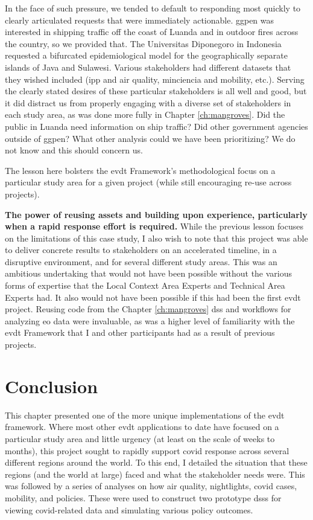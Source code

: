 In the face of such pressure, we tended to default to responding most quickly to clearly articulated requests that were immediately actionable. \ac{ggpen} was interested in shipping traffic off the coast of Luanda and in outdoor fires across the country, so we provided that. The Universitas Diponegoro in Indonesia requested a bifurcated epidemiological model for the geographically separate islands of Java and Sulawesi. Various stakeholders had different datasets that they wished included (\ac{ipp} and air quality, \ac{minciencia} and mobility, etc.). Serving the clearly stated desires of these particular stakeholders is all well and good, but it did distract us from properly engaging with a diverse set of stakeholders in each study area, as was done more fully in Chapter \ref{ch:mangroves}. Did the public in Luanda need information on ship traffic? Did other government agencies outside of \ac{ggpen}? What other analysis could we have been prioritizing? We do not know and this should concern us.

The lesson here bolsters the \ac{evdt} Framework's methodological focus on a particular study area for a given project (while still encouraging re-use across projects). 

\textbf{The power of reusing assets and building upon experience, particularly when a rapid response effort is required.} While the previous lesson focuses on the limitations of this case study, I also wish to note that this project was able to deliver concrete results to stakeholders on an accelerated timeline, in a disruptive environment, and for several different study areas. This was an ambitious undertaking that would not have been possible without the various forms of expertise that the Local Context Area Experts and Technical Area Experts had. It also would not have been possible if this had been the first \ac{evdt} project. Reusing code from the Chapter \ref{ch:mangroves} \ac{dss} and workflows for analyzing \ac{eo} data were invaluable, as was a higher level of familiarity with the \ac{evdt} Framework that I and other participants had as a result of previous projects.


\section{Conclusion} \label{sec:vida-concl}

This chapter presented one of the more unique implementations of the \ac{evdt} framework. Where most other \ac{evdt} applications to date have focused on a particular study area and little urgency (at least on the scale of weeks to months), this project sought to rapidly support \ac{covid} response across several different regions around the world. To this end, I detailed the situation that these regions (and the world at large) faced and what the stakeholder needs were. This was followed by a series of analyses on how air quality, nightlights, \ac{covid} cases, mobility, and policies. These were used to construct two prototype \acp{dss} for viewing \ac{covid}-related data and simulating various policy outcomes.

